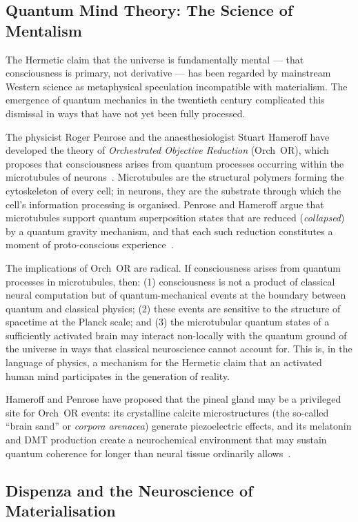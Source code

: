 \documentclass[12pt, a4paper]{article}
\begin{document}
\subsection{Quantum Mind Theory: The Science of Mentalism}

The Hermetic claim that the universe is fundamentally mental — that
consciousness is primary, not derivative — has been regarded by mainstream
Western science as metaphysical speculation incompatible with
materialism. The emergence of quantum mechanics in the twentieth century
complicated this dismissal in ways that have not yet been fully processed.

The physicist Roger Penrose and the anaesthesiologist Stuart Hameroff have
developed the theory of \emph{Orchestrated Objective Reduction} (Orch~OR),
which proposes that consciousness arises from quantum processes occurring
within the microtubules of neurons~\autocite{hameroff1996}. Microtubules are
the structural polymers forming the cytoskeleton of every cell; in neurons,
they are the substrate through which the cell's information processing is
organised. Penrose and Hameroff argue that microtubules support quantum
superposition states that are reduced (\emph{collapsed}) by a quantum gravity
mechanism, and that each such reduction constitutes a moment of proto-conscious
experience~\autocite{hameroff2014}.

The implications of Orch~OR are radical. If consciousness arises from quantum
processes in microtubules, then: (1) consciousness is not a product of
classical neural computation but of quantum-mechanical events at the boundary
between quantum and classical physics; (2) these events are sensitive to the
structure of spacetime at the Planck scale; and (3) the microtubular
quantum states of a sufficiently activated brain may interact non-locally with
the quantum ground of the universe in ways that classical neuroscience cannot
account for. This is, in the language of physics, a mechanism for the
Hermetic claim that an activated human mind participates in the generation of
reality.

Hameroff and Penrose have proposed that the pineal gland may be a
privileged site for Orch~OR events: its crystalline calcite microstructures
(the so-called ``brain sand'' or \emph{corpora arenacea}) generate
piezoelectric effects, and its melatonin and DMT production create a
neurochemical environment that may sustain quantum coherence for longer than
neural tissue ordinarily
allows~\autocite[56]{hameroff2014}.

\subsection{Dispenza and the Neuroscience of Materialisation}
\end{document}
